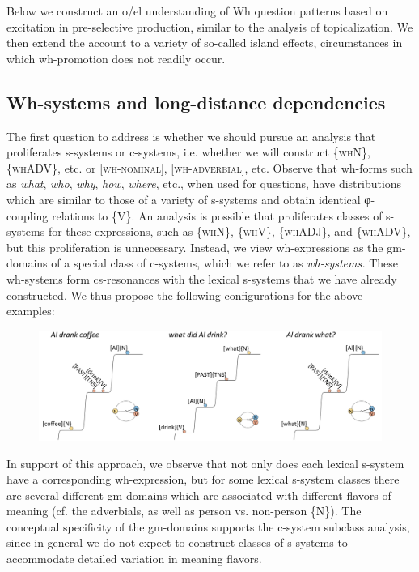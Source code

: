   Below we construct an o/el understanding of Wh question patterns based on excitation in pre-selective production, similar to the analysis of topicalization. We then extend the account to a variety of so-called island effects, circumstances in which wh-promotion does not readily occur. 

\subsection{Wh-systems and long-distance dependencies}

The first question to address is whether we should pursue an analysis that proliferates s-systems or c-systems, i.e. whether we will construct \{\textsc{whN}\}, \{\textsc{whADV}\}, etc. or [\textsc{wh-nominal}], [\textsc{wh-adverbial}], etc. Observe that wh-forms such as \textit{what}, \textit{who}, \textit{why}, \textit{how}, \textit{where}, etc., when used for questions, have distributions which are similar to those of a variety of s-systems and obtain identical φ-coupling relations to \{V\}. An analysis is possible that proliferates classes of s-systems for these expressions, such as \{\textsc{whN}\}, \{\textsc{whV}\}, \{\textsc{whADJ}\}, and \{\textsc{whADV}\}, but this proliferation is unnecessary. Instead, we view wh-expressions as the gm-domains of a special class of c-systems, which we refer to as \textit{wh-systems.} These wh-systems form cs-resonances with the lexical s-systems that we have already constructed. We thus propose the following configurations for the above examples:

  
\begin{figure}
\includegraphics[width=\textwidth]{figures/Tilsen-img158.png}
\caption{\missingcaption}
\label{fig:}
\end{figure}
 

  In support of this approach, we observe that not only does each lexical s-system have a corresponding wh-expression, but for some lexical s-system classes there are several different gm-domains which are associated with different flavors of meaning (cf. the adverbials, as well as person vs. non-person \{N\}). The conceptual specificity of the gm-domains supports the c-system subclass analysis, since in general we do not expect to construct classes of s-systems to accommodate detailed variation in meaning flavors.

